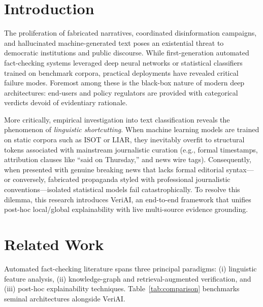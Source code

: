 \documentclass[10pt,journal,compsoc]{IEEEtran}
\begin{document}
\maketitle
\IEEEdisplaynontitleabstractindextext
\IEEEpeerreviewmaketitle

\section{Introduction}
The proliferation of fabricated narratives, coordinated disinformation campaigns, and hallucinated machine-generated text poses an existential threat to democratic institutions and public discourse. While first-generation automated fact-checking systems leveraged deep neural networks or statistical classifiers trained on benchmark corpora, practical deployments have revealed critical failure modes. Foremost among these is the black-box nature of modern deep architectures: end-users and policy regulators are provided with categorical verdicts devoid of evidentiary rationale.

More critically, empirical investigation into text classification reveals the phenomenon of \textit{linguistic shortcutting}. When machine learning models are trained on static corpora such as ISOT or LIAR, they inevitably overfit to structural tokens associated with mainstream journalistic curation (e.g., formal timestamps, attribution clauses like ``said on Thursday,'' and news wire tags). Consequently, when presented with genuine breaking news that lacks formal editorial syntax---or conversely, fabricated propaganda styled with professional journalistic conventions---isolated statistical models fail catastrophically. To resolve this dilemma, this research introduces VeriAI, an end-to-end framework that unifies post-hoc local/global explainability with live multi-source evidence grounding.

\section{Related Work}
Automated fact-checking literature spans three principal paradigms: (i) linguistic feature analysis, (ii) knowledge-graph and retrieval-augmented verification, and (iii) post-hoc explainability techniques. Table~\ref{tab:comparison} benchmarks seminal architectures alongside VeriAI.
\end{document}
